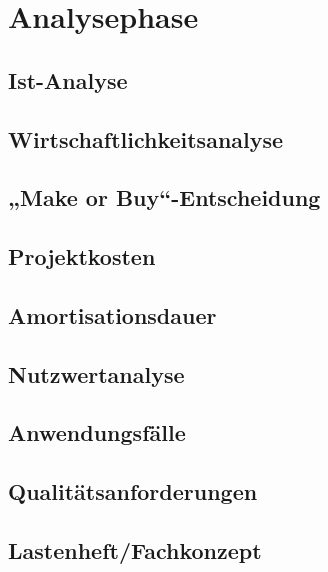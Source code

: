 
\section{Analysephase}
\blindtext
\subsection{Ist-Analyse}
\subsection{Wirtschaftlichkeitsanalyse}
\subsection{„Make or Buy“-Entscheidung}
\subsection{Projektkosten}
\subsection{Amortisationsdauer}
\subsection{Nutzwertanalyse}
\subsection{Anwendungsfälle}
\subsection{Qualitätsanforderungen}
\subsection{Lastenheft/Fachkonzept}